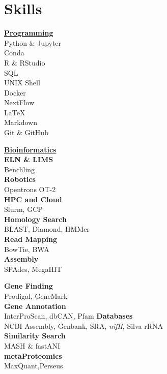 \documentclass[letterpaper]{twentysecondcv3} %
\begin{document}
\makeprofile %
 

\section{Skills}
\setlength\multicolsep{0pt}
\begin{multicols}{4}
\textbf{\underline{Programming}}\\
Python \& Jupyter\\
Conda\\%
R \& RStudio\\
SQL\\
UNIX Shell\\
Docker\\
NextFlow\\
\LaTeX\\
Markdown\\
Git \& GitHub\columnbreak

\textbf{\underline{Bioinformatics}}\\
\textbf{ELN \& LIMS}\\
Benchling\\
\textbf{Robotics}\\
Opentrons OT-2\\
\textbf{HPC and Cloud}\\
Slurm, GCP\\
\textbf{Homology Search}\\
BLAST, Diamond, HMMer\\
\textbf{Read Mapping}\\
BowTie, BWA\\%
\textbf{Assembly}\\
SPAdes, MegaHIT\columnbreak

\textbf{Gene Finding}\\
Prodigal, GeneMark\\
\textbf{Gene Annotation}\\
InterProScan, dbCAN, Pfam
\textbf{Databases}\\
NCBI Assembly, Genbank, SRA, \emph{nifH}, Silva rRNA\\
\textbf{Similarity Search}\\
MASH \& fastANI\\
\textbf{metaProteomics}\\
MaxQuant,Perseus\columnbreak


\end{multicols}
\end{document}
